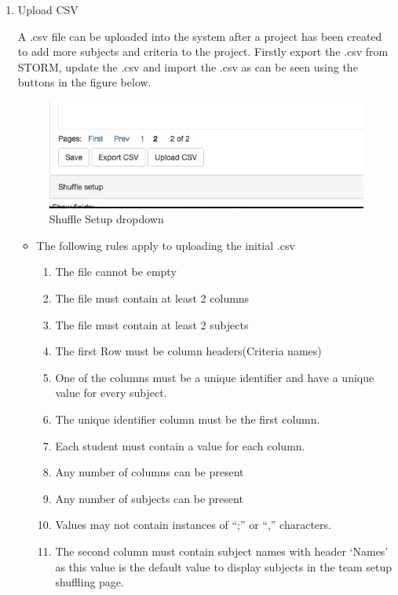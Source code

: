 \begin{enumerate}
\item Upload CSV\par
A .csv file can be uploaded into the system after a project has been created to add more subjects and criteria to the project. Firstly export the .csv from STORM, update the .csv and import the .csv as can be seen using the buttons in the figure below.\par
 \begin{figure}[H] 
	\centering
	\includegraphics[width=13cm]{./graphics/UploadCSV.jpg}\par
	\caption{Shuffle Setup dropdown}
\end{figure}
\begin{itemize}
	\item The following rules apply to uploading the initial .csv
	\begin{enumerate}
		\item The file cannot be empty
		\item The file must contain at least 2 columns 
		\item The file must contain at least 2 subjects
		\item The first Row must be column headers(Criteria names)
		\item One of the columns must be a unique identifier and have a unique value for every subject.
		\item The unique identifier column must be the first column.
		\item Each student must contain a value for each column.
		\item Any number of columns can be present
		\item Any number of subjects can be present
		\item Values may not contain instances of “;” or “,” characters.
		\item The second column must contain subject names with header ‘Names’ as this value is the default value to 				display subjects in the team setup shuffling page.
	\end{enumerate}
 \begin{figure}[H] 

\end{figure}
\end{itemize}
\end{enumerate}
